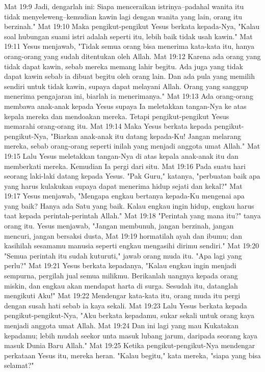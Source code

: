 Mat 19:9  Jadi, dengarlah ini: Siapa menceraikan istrinya--padahal wanita itu tidak menyeleweng--kemudian kawin lagi dengan wanita yang lain, orang itu berzinah."
Mat 19:10  Maka pengikut-pengikut Yesus berkata kepada-Nya, "Kalau soal hubungan suami istri adalah seperti itu, lebih baik tidak usah kawin."
Mat 19:11  Yesus menjawab, "Tidak semua orang bisa menerima kata-kata itu, hanya orang-orang yang sudah ditentukan oleh Allah.
Mat 19:12  Karena ada orang yang tidak dapat kawin, sebab mereka memang lahir begitu. Ada juga yang tidak dapat kawin sebab ia dibuat begitu oleh orang lain. Dan ada pula yang memilih sendiri untuk tidak kawin, supaya dapat melayani Allah. Orang yang sanggup menerima pengajaran ini, biarlah ia menerimanya."
Mat 19:13  Ada orang-orang membawa anak-anak kepada Yesus supaya Ia meletakkan tangan-Nya ke atas kepala mereka dan mendoakan mereka. Tetapi pengikut-pengikut Yesus memarahi orang-orang itu.
Mat 19:14  Maka Yesus berkata kepada pengikut-pengikut-Nya, "Biarkan anak-anak itu datang kepada-Ku! Jangan melarang mereka, sebab orang-orang seperti inilah yang menjadi anggota umat Allah."
Mat 19:15  Lalu Yesus meletakkan tangan-Nya di atas kepala anak-anak itu dan memberkati mereka. Kemudian Ia pergi dari situ.
Mat 19:16  Pada suatu hari seorang laki-laki datang kepada Yesus. "Pak Guru," katanya, "perbuatan baik apa yang harus kulakukan supaya dapat menerima hidup sejati dan kekal?"
Mat 19:17  Yesus menjawab, "Mengapa engkau bertanya kepada-Ku mengenai apa yang baik? Hanya ada Satu yang baik. Kalau engkau ingin hidup, engkau harus taat kepada perintah-perintah Allah."
Mat 19:18  "Perintah yang mana itu?" tanya orang itu. Yesus menjawab, "Jangan membunuh, jangan berzinah, jangan mencuri, jangan bersaksi dusta,
Mat 19:19  hormatilah ayah dan ibumu; dan kasihilah sesamamu manusia seperti engkau mengasihi dirimu sendiri."
Mat 19:20  "Semua perintah itu sudah kuturuti," jawab orang muda itu. "Apa lagi yang perlu?"
Mat 19:21  Yesus berkata kepadanya, "Kalau engkau ingin menjadi sempurna, pergilah jual semua milikmu. Berikanlah uangnya kepada orang miskin, dan engkau akan mendapat harta di surga. Sesudah itu, datanglah mengikuti Aku!"
Mat 19:22  Mendengar kata-kata itu, orang muda itu pergi dengan susah hati sebab ia kaya sekali.
Mat 19:23  Lalu Yesus berkata kepada pengikut-pengikut-Nya, "Aku berkata kepadamu, sukar sekali untuk orang kaya menjadi anggota umat Allah.
Mat 19:24  Dan ini lagi yang mau Kukatakan kepadamu; lebih mudah seekor unta masuk lubang jarum, daripada seorang kaya masuk Dunia Baru Allah."
Mat 19:25  Ketika pengikut-pengikut-Nya mendengar perkataan Yesus itu, mereka heran. "Kalau begitu," kata mereka, "siapa yang bisa selamat?"
